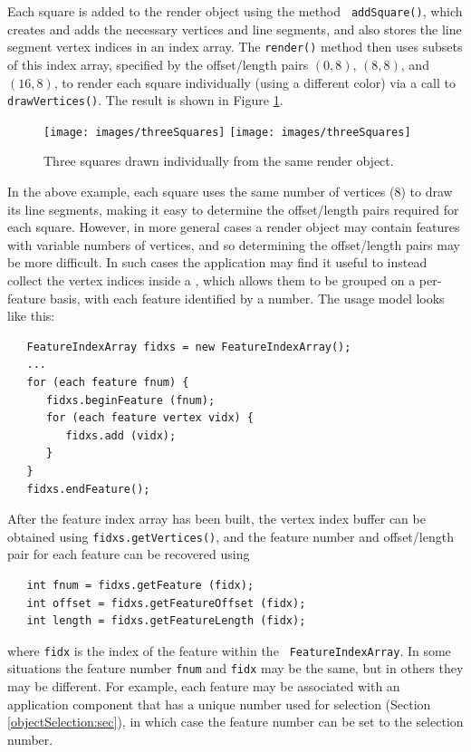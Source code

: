 %
Each square is added to the render object using the method {\tt
addSquare()}, which creates and adds the necessary vertices and line
segments, and also stores the line segment vertex indices in an index
array. The {\tt render()} method then uses subsets of this index
array, specified by the offset/length pairs $(0, 8)$, $(8, 8)$, and
$(16, 8)$, to render each square individually (using a different
color) via a call to {\tt drawVertices()}.  The result is shown in
Figure \ref{threeSquares:fig}.

\begin{figure}[h]
\begin{center}
\iflatexml
 \texttt{[image: images/threeSquares]}
\else
 \texttt{[image: images/threeSquares]}
\fi
\end{center}
\caption{Three squares drawn individually from the same render object.}
\label{threeSquares:fig}
\end{figure}
%

In the above example, each square uses the same number of vertices (8)
to draw its line segments, making it easy to determine the
offset/length pairs required for each square. However, in more
general cases a render object may contain features with variable
numbers of vertices, and so determining the offset/length pairs
may be more difficult.  In
such cases the application may find it useful to instead collect the
vertex indices inside a ,
which allows them to be grouped on a per-feature basis, with each
feature identified by a number. The usage model looks like this:
%
\begin{lstlisting}
   FeatureIndexArray fidxs = new FeatureIndexArray();
   ...
   for (each feature fnum) {
      fidxs.beginFeature (fnum);
      for (each feature vertex vidx) {
         fidxs.add (vidx);
      }
   }
   fidxs.endFeature();   
\end{lstlisting}
%
After the feature index array has been built, the vertex index buffer
can be obtained using {\tt fidxs.getVertices()}, and the feature
number and offset/length pair for each feature can be recovered using
%
\begin{lstlisting}
   int fnum = fidxs.getFeature (fidx);
   int offset = fidxs.getFeatureOffset (fidx);
   int length = fidxs.getFeatureLength (fidx);
\end{lstlisting}
%
where {\tt fidx} is the index of the feature within the {\tt
FeatureIndexArray}. In some situations the feature number {\tt fnum}
and {\tt fidx} may be the same, but in others they may be different.
For example, each feature may be associated with an application
component that has a unique number used for selection (Section
\ref{objectSelection:sec}), in which case the feature number can be
set to the selection number.

